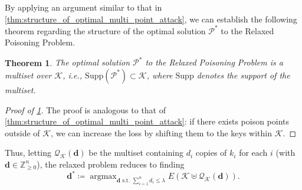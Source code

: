 \documentclass[acmsmall]{acmart}
\newtheorem{theorem}{Theorem}
\DeclareMathOperator*{\argmax}{argmax}
\begin{document}
By applying an argument similar to that in \cref{thm:structure_of_optimal_multi_point_attack}, we can establish the following theorem regarding the structure of the optimal solution $\mathcal{P}^\ast$ to the Relaxed Poisoning Problem.
\begin{theorem_box}
\begin{theorem}
\label{thm:relaxed_poisoning_problem}
The optimal solution $\mathcal{P}^\ast$ to the Relaxed Poisoning Problem is a multiset over $\mathcal{K}$, i.e., $\mathrm{Supp}(\mathcal{P}^\ast) \subset \mathcal{K}$, where $\mathrm{Supp}$ denotes the support of the multiset.
\end{theorem}
\end{theorem_box}
\begin{proof}[Proof of \cref{thm:relaxed_poisoning_problem}]
The proof is analogous to that of \cref{thm:structure_of_optimal_multi_point_attack}:
if there exists poison points outside of $\mathcal{K}$, we can increase the loss by shifting them to the keys within $\mathcal{K}$.
\end{proof}
Thus, letting $\mathcal{Q}_{\mathcal{K}}(\bm{d})$ be the multiset containing $d_i$ copies of $k_i$ for each $i$ (with $\bm{d} \in \mathbb{Z}_{\geq 0}^n$), the relaxed problem reduces to finding
\begin{equation}
    \bm{d}^\ast \coloneq \argmax_{\bm{d} \text{ s.t. } \sum_{i=1}^{n} d_i \leq \lambda} E(\mathcal{K} \uplus \mathcal{Q}_\mathcal{K}(\bm{d})).
\end{equation}
\end{document}
